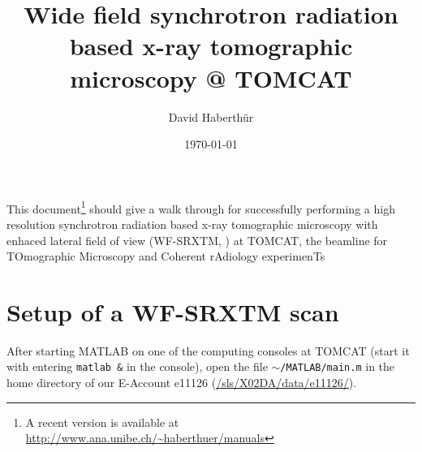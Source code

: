 \documentclass[a4paper]{scrartcl}
\title{Wide field synchrotron radiation based x-ray tomographic microscopy @ TOMCAT}
\author{David Haberthür}
\date{\today}
\begin{document}
\maketitle
This document\footnote{A recent version is available at \url{http://www.ana.unibe.ch/~haberthuer/manuals}} 
should give a walk through for successfully performing a high resolution synchrotron radiation based x-ray tomographic microscopy with enhaced lateral field of view (WF-SRXTM, \cite{Haberthuer2009d}) at TOMCAT, the beamline for TOmographic Microscopy and Coherent rAdiology experimenTs~\cite{Stampanoni2007}

\section[Setup]{Setup of a WF-SRXTM scan}
After starting MATLAB on one of the computing consoles at TOMCAT (start it with entering \verb+matlab &+ in the console), open the file $\sim$\verb+/MATLAB/main.m+ in the home directory of our E-Account e11126 (\url{/sls/X02DA/data/e11126/}).
\end{document}
